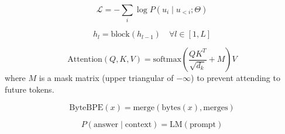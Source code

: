 
\begin{equation}
\mathcal{L} = -\sum_{i} \log P(u_i \mid u_{<i}; \Theta)
\end{equation}

\begin{equation}
h_l = \text{block}(h_{l-1}) \quad \forall l \in [1, L]
\end{equation}

\begin{equation}
\text{Attention}(Q, K, V) = \text{softmax}\left( \frac{QK^T}{\sqrt{d_k}} + M \right) V
\end{equation}
where \(M\) is a mask matrix (upper triangular of \(-\infty\)) to prevent attending to future tokens.

\begin{equation}
\text{ByteBPE}(x) = \text{merge}(\text{bytes}(x), \text{merges})
\end{equation}

\begin{equation}
P(\text{answer} \mid \text{context}) = \text{LM}(\text{prompt})
\end{equation}